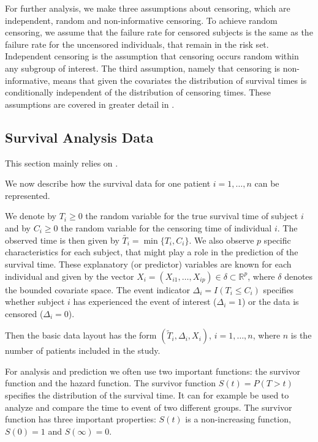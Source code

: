 \documentclass[12pt, a4paper]{article}
\theoremstyle{definition}
\theoremstyle{plain}
\numberwithin{equation}{section}
\numberwithin{figure}{section}
\numberwithin{table}{section}
\begin{document}
	For further analysis, we make three assumptions about censoring, which are independent, random and non-informative censoring.
	To achieve random censoring, we assume that the failure rate for censored subjects is the same as the failure rate for the uncensored individuals, that remain in the risk set.
	Independent censoring is the assumption that censoring occurs random within any subgroup of interest.
	The third assumption, namely that censoring is non-informative, means that given the covariates the distribution of survival times is conditionally independent of the distribution of censoring times.
	These assumptions are covered in greater detail in \citet*{bookfailuretime}.
	
	
	\subsection{Survival Analysis Data} \label{sabasics}
	
	This section mainly relies on \citet*{sabook}.
	
	We now describe how the survival data for one patient $i = 1, \dots, n$ can be represented.
	
	We denote by $T_i \geq 0$ the random variable for the true survival time of subject $i$ and by $C_i \geq 0$ the random variable for the censoring time of individual $i$.
	The observed time is then given by $\tilde{T_i} = \min\{T_i,C_i\}$.
	We also observe $p$ specific characteristics for each subject, that might play a role in the prediction of the survival time.
	These explanatory (or predictor) variables are known for each individual and given by the vector $X_i = (X_{i1}, \dots , X_{ip}) \in \delta \subset \mathbb{R}^p$, where $\delta$ denotes the bounded covariate space.
	The event indicator $\Delta_i = I(T_i \leq C_i)$ specifies whether subject $i$ has experienced the event of interest ($\Delta_i=1$) or the data is censored ($\Delta_i=0$).
	
	Then the basic data layout has the form $(\tilde{T}_i, \Delta_i, X_i)$, $i = 1, \dots , n$, where $n$ is the number of patients included in the study.
	
	
	For analysis and prediction we often use two important functions: the survivor function and the hazard function.
	The survivor function $S(t) = P(T > t)$ specifies the distribution of the survival time.
	It can for example be used to analyze and compare the time to event of two different groups.
	The survivor function has three important properties: $S(t)$ is a non-increasing function, $S(0)=1$ and $S(\infty)=0$.
\end{document}
